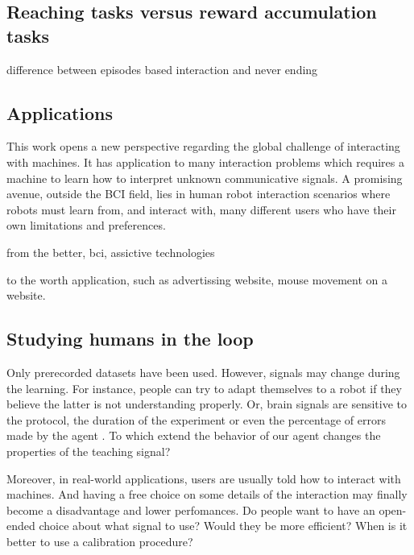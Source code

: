 \subsection{Reaching tasks versus reward accumulation tasks}

difference between episodes based interaction and never ending 


\subsection{Applications}

This work opens a new perspective regarding the global challenge of interacting with machines. It has application to many interaction problems which requires a machine to learn how to interpret unknown communicative signals. A promising avenue, outside the BCI field, lies in human robot interaction scenarios where robots must learn from, and interact with, many different users who have their own limitations and preferences.

from the better, bci, assictive technologies

to the worth application, such as advertissing website, mouse movement on a website.

\subsection{Studying humans in the loop}
\label{chapter:limitations:userstudies}


Only prerecorded datasets have been used. However, signals may change during the learning. For instance, people can try to adapt themselves to a robot if they believe the latter is not understanding properly. Or, brain signals are sensitive to the protocol, the duration of the experiment or even the percentage of errors made by the agent \cite{chavarriaga2010learning}. To which extend the behavior of our agent changes the properties of the teaching signal? 

Moreover, in real-world applications, users are usually told how to interact with machines. And having a free choice on some details of the interaction may finally become a disadvantage and lower perfomances. Do people want to have an open-ended choice about what signal to use? Would they be more efficient? When is it better to use a calibration procedure?

